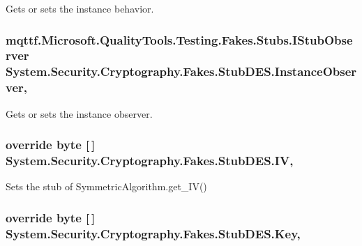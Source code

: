 Gets or sets the instance behavior.

\hypertarget{class_system_1_1_security_1_1_cryptography_1_1_fakes_1_1_stub_d_e_s_a81e6902ba8cf9464e2c623c07a2ed058}{
\subsubsection[{Instance\-Observer}]{\setlength{\rightskip}{0pt plus 5cm}mqttf.\-Microsoft.\-Quality\-Tools.\-Testing.\-Fakes.\-Stubs.\-I\-Stub\-Observer System.\-Security.\-Cryptography.\-Fakes.\-Stub\-D\-E\-S.\-Instance\-Observer\hspace{0.3cm}{\ttfamily [get]}, {\ttfamily [set]}}}\label{class_system_1_1_security_1_1_cryptography_1_1_fakes_1_1_stub_d_e_s_a81e6902ba8cf9464e2c623c07a2ed058}


Gets or sets the instance observer.

\hypertarget{class_system_1_1_security_1_1_cryptography_1_1_fakes_1_1_stub_d_e_s_acb87dd4ff9e3892aea49a716985fab15}{
\subsubsection[{I\-V}]{\setlength{\rightskip}{0pt plus 5cm}override byte \mbox{[}$\,$\mbox{]} System.\-Security.\-Cryptography.\-Fakes.\-Stub\-D\-E\-S.\-I\-V\hspace{0.3cm}{\ttfamily [get]}, {\ttfamily [set]}}}\label{class_system_1_1_security_1_1_cryptography_1_1_fakes_1_1_stub_d_e_s_acb87dd4ff9e3892aea49a716985fab15}


Sets the stub of Symmetric\-Algorithm.\-get\-\_\-\-I\-V()

\hypertarget{class_system_1_1_security_1_1_cryptography_1_1_fakes_1_1_stub_d_e_s_a430e3d5411d9577b731819c3b37b946b}{
\subsubsection[{Key}]{\setlength{\rightskip}{0pt plus 5cm}override byte \mbox{[}$\,$\mbox{]} System.\-Security.\-Cryptography.\-Fakes.\-Stub\-D\-E\-S.\-Key\hspace{0.3cm}{\ttfamily [get]}, {\ttfamily [set]}}}\label{class_system_1_1_security_1_1_cryptography_1_1_fakes_1_1_stub_d_e_s_a430e3d5411d9577b731819c3b37b946b}


